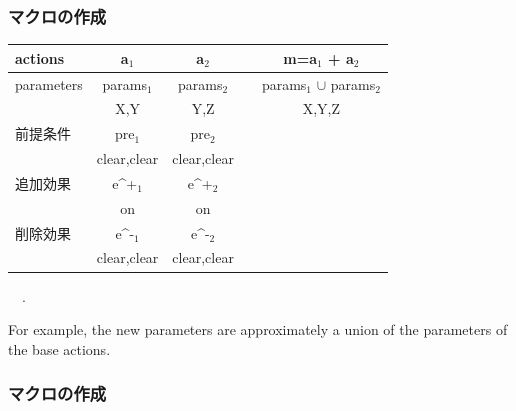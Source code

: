 \subsubsection{マクロの作成}
\label{sec-6-3-1}

\begin{center}
\begin{center}
\begin{tabular}{l|cc|l|c|}
actions & a$_{\text{1}}$ & a$_{\text{2}}$ &  & m=a$_{\text{1}}$ + a$_{\text{2}}$\\
\hline
parameters & params$_{\text{1}}$ & params$_{\text{2}}$ &  & params$_{\text{1}}$ $\cup$ params$_{\text{2}}$\\
 & X,Y & Y,Z &  & X,Y,Z\\
前提条件 & pre$_{\text{1}}$ & pre$_{\text{2}}$ &  & \\
 & clear,clear & clear,clear &  & \\
追加効果 & e\^{}+$_{\text{1}}$ & e\^{}+$_{\text{2}}$ &  & \\
 & on & on &  & \\
削除効果 & e\^{}-$_{\text{1}}$ & e\^{}-$_{\text{2}}$ &  & \\
 & clear,clear & clear,clear &  & \\
\end{tabular}
\end{center}
\end{center}

\begin{alignright}
　.
\end{alignright}

\begin{resume}
For example, the new parameters are approximately a union of the parameters
of the base actions.
\end{resume}

\subsubsection{マクロの作成}
\label{sec-6-3-2}

